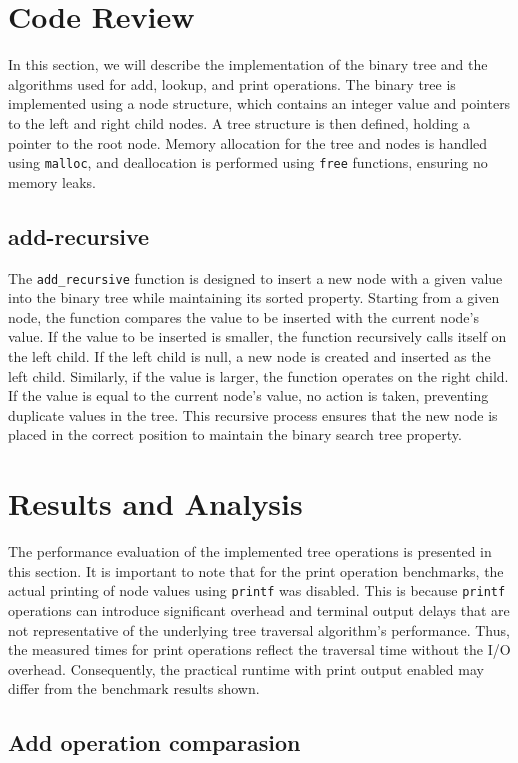 \documentclass[a4paper,11pt]{article}
\begin{document}
\section*{Code Review}
In this section, we will describe the implementation of the binary tree and the algorithms used for add, lookup, and print operations. The binary tree is implemented using a node structure, which contains an integer value and pointers to the left and right child nodes. A tree structure is then defined, holding a pointer to the root node. Memory allocation for the tree and nodes is handled using \texttt{malloc}, and deallocation is performed using \texttt{free} functions, ensuring no memory leaks.

\subsection*{add-recursive}
The \texttt{add\_recursive} function is designed to insert a new node with a given value into the binary tree while maintaining its sorted property. Starting from a given node, the function compares the value to be inserted with the current node's value. If the value to be inserted is smaller, the function recursively calls itself on the left child. If the left child is null, a new node is created and inserted as the left child. Similarly, if the value is larger, the function operates on the right child. If the value is equal to the current node's value, no action is taken, preventing duplicate values in the tree. This recursive process ensures that the new node is placed in the correct position to maintain the binary search tree property.


\section*{Results and Analysis}
The performance evaluation of the implemented tree operations is presented in this section. It is important to note that for the print operation benchmarks, the actual printing of node values using \texttt{printf} was disabled. This is because \texttt{printf} operations can introduce significant overhead and terminal output delays that are not representative of the underlying tree traversal algorithm's performance. Thus, the measured times for print operations reflect the traversal time without the I/O overhead. Consequently, the practical runtime with print output enabled may differ from the benchmark results shown.

\subsection*{Add operation comparasion}
\end{document}

